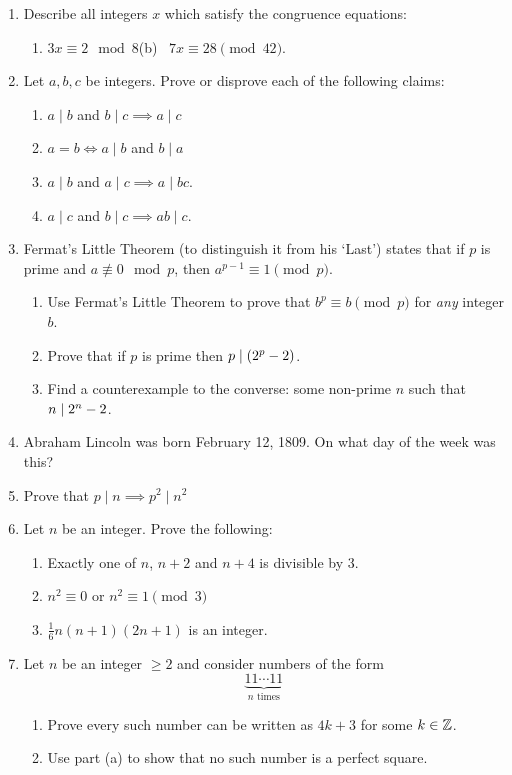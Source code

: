 \begin{exercises}{}{}
\begin{enumerate}
    
  \item Describe all integers $x$ which satisfy the congruence equations:
  \begin{enumerate}
    \item $3x\equiv 2\mod 8$\qquad\qquad (b) \ $7x\equiv 28\pmod{42}$.
  \end{enumerate}
	
	\item Let $a,b,c$ be integers. Prove or disprove each of the following claims:
	\begin{enumerate}
	  \item $a\mid b$ and $b\mid c\implies a\mid c$
	  \item $a=b\iff a\mid b$ and $b\mid a$
	  \item $a\mid b$ and $a\mid c\implies a\mid bc$.
    \item $a\mid c$ and $b\mid c\implies ab\mid c$.
  \end{enumerate}
  
    
  \item Fermat's Little Theorem (to distinguish it from his `Last') states that if $p$ is prime and $a\not\equiv 0\mod p$, then $a^{p-1}\equiv 1\pmod p$.
	\begin{enumerate}
	  \item Use Fermat's Little Theorem to prove that $b^p\equiv b\pmod p$ for \emph{any} integer $b$.
	  \item Prove that if $p$ is prime then $p\mid (2^p-2)$.
	  \item Find a counterexample to the converse: some non-prime $n$ such that $n\mid 2^n-2$.
	\end{enumerate}
	
	\item Abraham Lincoln was born February 12\th, 1809. On what day of the week was this?
	
	\item Prove that $p\mid n\implies p^2\mid n^2$
		
		
	\item Let $n$ be an integer. Prove the following:
	\begin{enumerate}
    \item Exactly one of $n$, $n+2$ and $n+4$ is divisible by 3.
    \item $n^2\equiv 0$ or $n^2\equiv 1\pmod 3$
	  \item $\frac 16n(n+1)(2n+1)$ is an integer.
  \end{enumerate}
    
    \item Let $n$ be an integer $\ge 2$ and consider numbers of the form
    \[
    	\underbrace{11\cdots 11}_{n \text{ times}}
    \]
    \begin{enumerate}
      \item Prove every such number can be written as $4k+3$ for some $k\in\mathbb{Z}$.
      \item Use part (a) to show that no such number is a perfect square.
    \end{enumerate}
    

\end{enumerate}
\end{exercises}
